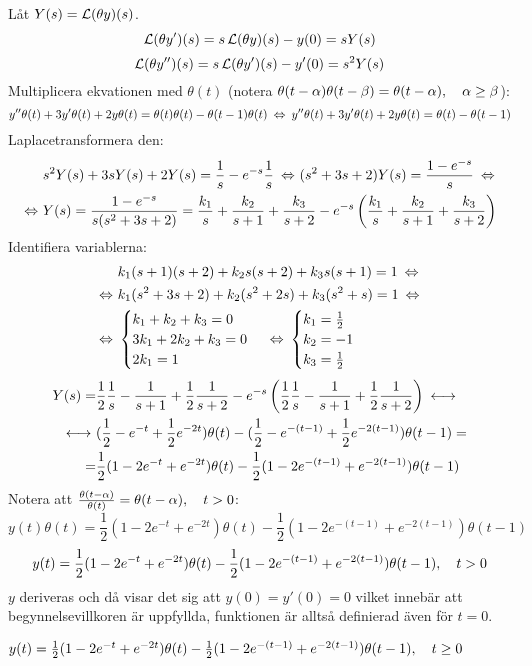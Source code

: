 \pagebreak
\begin{task}{5.8}
	Låt $Y(s)=\operatorname{\mathcal{L}}(\theta y)(s)$.
	\[\operatorname{\mathcal{L}}(\theta y')(s)=s\operatorname{\mathcal{L}}(\theta y)(s)-y(0)=sY(s)\]
	\[\operatorname{\mathcal{L}}(\theta y'')(s)=s\operatorname{\mathcal{L}}(\theta y')(s)-y'(0)=s^2Y(s)\]
	Multiplicera ekvationen med $\theta(t)$ (notera $\theta(t-\alpha)\theta(t-\beta)=\theta(t-\alpha), \quad \alpha \ge \beta$):
	\[y''\theta(t)+3y'\theta(t)+2y\theta(t)=\theta(t)\theta(t)-\theta(t-1)\theta(t) \lra
	y''\theta(t)+3y'\theta(t)+2y\theta(t)=\theta(t)-\theta(t-1)\]
	Laplacetransformera den:
	\begin{align*}
	&s^2Y(s)+3sY(s)+2Y(s)=\frac{1}{s}-e^{-s}\frac{1}{s} \lra
	(s^2+3s+2)Y(s)=\frac{1-e^{-s}}{s} \lra \\ \lra
	&Y(s)=
	\frac{1-e^{-s}}{s(s^2+3s+2)}=
	\frac{k_1}{s}+\frac{k_2}{s+1}+\frac{k_3}{s+2}-e^{-s}\left(\frac{k_1}{s}+\frac{k_2}{s+1}+\frac{k_3}{s+2}\right)
	\end{align*}
	Identifiera variablerna:
	\begin{align*}
	&k_1(s+1)(s+2)+k_2s(s+2)+k_3s(s+1)=1 \lra \\ \lra
	&k_1(s^2+3s+2)+k_2(s^2+2s)+k_3(s^2+s)=1 \lra \\ \lra
	&\begin{cases}
	k_1+k_2+k_3=0 \\
	3k_1+2k_2+k_3=0 \\
	2k_1=1
	\end{cases} \lra
	\begin{cases}
	k_1=\frac{1}{2} \\
	k_2=-1 \\
	k_3=\frac{1}{2}
	\end{cases}
	\end{align*}
	\begin{align*}
	Y(s)=
	&\frac{1}{2}\*\frac{1}{s}-\frac{1}{s+1}+\frac{1}{2}\*\frac{1}{s+2}-e^{-s}\left(\frac{1}{2}\*\frac{1}{s}-\frac{1}{s+1}+\frac{1}{2}\*\frac{1}{s+2}\right)\llra \\ \llra
	&(\frac{1}{2}-e^{-t}+\frac{1}{2}e^{-2t})\theta(t)-(\frac{1}{2}-e^{-(t-1)}+\frac{1}{2}e^{-2(t-1)})\theta(t-1)= \\ =
	&\frac{1}{2}(1-2e^{-t}+e^{-2t})\theta(t)-\frac{1}{2}(1-2e^{-(t-1)}+e^{-2(t-1)})\theta(t-1)
	\end{align*}
	Notera att $\frac{\theta(t-\alpha)}{\theta(t)}=\theta(t-\alpha), \quad t>0$:
	\[y(t)\theta(t)=\frac{1}{2}(1-2e^{-t}+e^{-2t})\theta(t)-\frac{1}{2}(1-2e^{-(t-1)}+e^{-2(t-1)})\theta(t-1)\]
	\[y(t)=\frac{1}{2}(1-2e^{-t}+e^{-2t})\theta(t)-\frac{1}{2}(1-2e^{-(t-1)}+e^{-2(t-1)})\theta(t-1), \quad t>0\]
	$y$ deriveras och då visar det sig att $y(0)=y'(0)=0$ vilket innebär att begynnelsevillkoren är uppfyllda, funktionen är alltså definierad även för $t=0$.
	
	\ans $y(t)=\frac{1}{2}(1-2e^{-t}+e^{-2t})\theta(t)-\frac{1}{2}(1-2e^{-(t-1)}+e^{-2(t-1)})\theta(t-1), \quad t\ge0$
\end{task}

